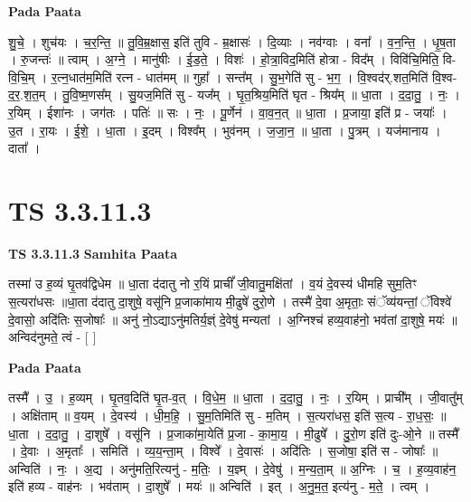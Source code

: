 \documentclass[17pt]{extarticle}
\begin{document}
\textbf{Pada Paata} \newline

शु॒चे॒ । शुच॑यः । च॒र॒न्ति॒ ॥ तु॒वि॒म्र॒क्षास॒ इति॑ तुवि - म्र॒क्षासः॑ । दि॒व्याः । नव॑ग्वाः । वना᳚ । व॒न॒न्ति॒ । धृ॒ष॒ता । रु॒जन्तः॑ ॥ त्वाम् । अ॒ग्ने॒ । मानु॑षीः । ई॒ड॒ते॒ । विशः॑ । हो॒त्रा॒विद॒मिति॑ होत्रा - विद᳚म् । विवि॑चि॒मिति॒ वि-वि॒चि॒म् । र॒त्न॒धात॑म॒मिति॑ रत्न - धात॑मम् ॥ गुहा᳚ । सन्त᳚म् । सु॒भ॒गेति॑ सु - भ॒ग॒ । वि॒श्वद॑र्.शत॒मिति॑ वि॒श्व-द॒र॒.श॒त॒म् । तु॒वि॒ष्म॒णस᳚म् । सु॒यज॒मिति॑ सु - यज᳚म् । घृ॒त॒श्रिय॒मिति॑ घृत - श्रिय᳚म् ॥ धा॒ता । द॒दा॒तु॒ । नः॒ । र॒यिम् । ईशा॑नः । जग॑तः । पतिः॑ ॥ सः । नः॒ । पू॒र्णेन॑ । वा॒व॒न॒त् ॥ धा॒ता । प्र॒जाया॒ इति॑ प्र - जयाः᳚ । उ॒त । रा॒यः । ई॒शे॒ । धा॒ता । इ॒दम् । विश्व᳚म् । भुव॑नम् । ज॒जा॒न॒ ॥ धा॒ता । पु॒त्रम् । यज॑मानाय । दाता᳚ ।  \newline





\section{ TS 3.3.11.3 }

\textbf{TS 3.3.11.3 } \newline
\textbf{Samhita Paata} \newline

तस्मा॑ उ ह॒व्यं घृ॒तव॑द्विधेम ॥ धा॒ता द॑दातु नो र॒यिं प्राचीं᳚ जी॒वातु॒मक्षि॑तां । व॒यं दे॒वस्य॑ धीमहि सुम॒तिꣳ स॒त्यरा॑धसः ॥धा॒ता द॑दातु दा॒शुषे॒ वसू॑नि प्र॒जाका॑माय मी॒ढुषे॑ दुरो॒णे । तस्मै॑ दे॒वा अ॒मृताः॒ संॅव्य॑यन्तां॒ ॅविश्वे॑ दे॒वासो॒ अदि॑तिः स॒जोषाः᳚ ॥ अनु॑ नो॒ऽद्याऽनु॑मतिर्य॒ज्ञ्ं दे॒वेषु॑ मन्यतां । अ॒ग्निश्च॑ हव्य॒वाह॑नो॒ भव॑तां दा॒शुषे॒ मयः॑ ॥ अन्विद॑नुमते॒ त्वं - [  ] \newline

\textbf{Pada Paata} \newline

तस्मै᳚ । उ॒ । ह॒व्यम् । घृ॒तव॒दिति॑ घृ॒त-व॒त् । वि॒धे॒म॒ ॥ धा॒ता । द॒दा॒तु॒ । नः॒ । र॒यिम् । प्राची᳚म् । जी॒वातु᳚म् । अक्षि॑ताम् ॥ व॒यम् । दे॒वस्य॑ । धी॒म॒हि॒ । सु॒म॒तिमिति॑ सु - म॒तिम् । स॒त्यरा॑धस॒ इति॑ स॒त्य - रा॒ध॒सः॒ ॥ धा॒ता । द॒दा॒तु॒ । दा॒शुषे᳚ । वसू॑नि । प्र॒जाका॑मा॒येति॑ प्र॒जा - का॒मा॒य॒ । मी॒ढुषे᳚ । दु॒रो॒ण इति॑ दुः-ओ॒ने ॥ तस्मै᳚ । दे॒वाः । अ॒मृताः᳚ । समिति॑ । व्य॒य॒न्ता॒म् । विश्वे᳚ । दे॒वासः॑ । अदि॑तिः । स॒जोषा॒ इति॑ स - जोषाः᳚ ॥ अन्विति॑ । नः॒ । अ॒द्य । अनु॑मति॒रित्यनु॑ - म॒तिः॒ । य॒ज्ञ्म् । दे॒वेषु॑ । म॒न्य॒ता॒म् ॥ अ॒ग्निः । च॒ । ह॒व्य॒वाह॑न॒ इति॑ हव्य - वाह॑नः । भव॑ताम् । दा॒शुषे᳚ । मयः॑ ॥ अन्विति॑ । इत् । अ॒नु॒म॒त॒ इत्य॑नु - म॒ते॒ । त्वम् ।  \newline
\end{document}

